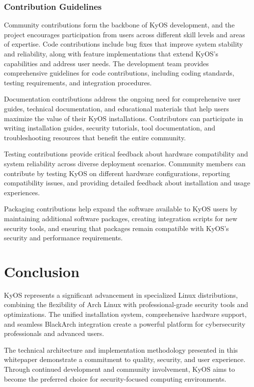 \documentclass[12pt,a4paper]{article}
\begin{document}
\subsubsection{Contribution Guidelines}
Community contributions form the backbone of KyOS development, and the project encourages participation from users across different skill levels and areas of expertise. Code contributions include bug fixes that improve system stability and reliability, along with feature implementations that extend KyOS's capabilities and address user needs. The development team provides comprehensive guidelines for code contributions, including coding standards, testing requirements, and integration procedures.

Documentation contributions address the ongoing need for comprehensive user guides, technical documentation, and educational materials that help users maximize the value of their KyOS installations. Contributors can participate in writing installation guides, security tutorials, tool documentation, and troubleshooting resources that benefit the entire community.

Testing contributions provide critical feedback about hardware compatibility and system reliability across diverse deployment scenarios. Community members can contribute by testing KyOS on different hardware configurations, reporting compatibility issues, and providing detailed feedback about installation and usage experiences.

Packaging contributions help expand the software available to KyOS users by maintaining additional software packages, creating integration scripts for new security tools, and ensuring that packages remain compatible with KyOS's security and performance requirements.

\section{Conclusion}

KyOS represents a significant advancement in specialized Linux distributions, combining the flexibility of Arch Linux with professional-grade security tools and optimizations. The unified installation system, comprehensive hardware support, and seamless BlackArch integration create a powerful platform for cybersecurity professionals and advanced users.

The technical architecture and implementation methodology presented in this whitepaper demonstrate a commitment to quality, security, and user experience. Through continued development and community involvement, KyOS aims to become the preferred choice for security-focused computing environments.
\end{document}
